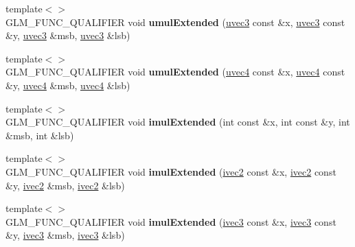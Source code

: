 \begin{DoxyCompactItemize}
\item 
\hypertarget{namespaceglm_a6e66bd04ac16ae0e3eb87e965b1609a9}{{\footnotesize template$<$$>$ }\\G\-L\-M\-\_\-\-F\-U\-N\-C\-\_\-\-Q\-U\-A\-L\-I\-F\-I\-E\-R void {\bfseries umul\-Extended} (\hyperlink{group__core__types_gac4ba593917841b859ba1683b8b52b8fa}{uvec3} const \&x, \hyperlink{group__core__types_gac4ba593917841b859ba1683b8b52b8fa}{uvec3} const \&y, \hyperlink{group__core__types_gac4ba593917841b859ba1683b8b52b8fa}{uvec3} \&msb, \hyperlink{group__core__types_gac4ba593917841b859ba1683b8b52b8fa}{uvec3} \&lsb)}\label{namespaceglm_a6e66bd04ac16ae0e3eb87e965b1609a9}

\item 
\hypertarget{namespaceglm_af466bd5c7fd7304b486b3f5985805349}{{\footnotesize template$<$$>$ }\\G\-L\-M\-\_\-\-F\-U\-N\-C\-\_\-\-Q\-U\-A\-L\-I\-F\-I\-E\-R void {\bfseries umul\-Extended} (\hyperlink{group__core__types_ga1c426d19627b32b14f0089f7f4ba7b1d}{uvec4} const \&x, \hyperlink{group__core__types_ga1c426d19627b32b14f0089f7f4ba7b1d}{uvec4} const \&y, \hyperlink{group__core__types_ga1c426d19627b32b14f0089f7f4ba7b1d}{uvec4} \&msb, \hyperlink{group__core__types_ga1c426d19627b32b14f0089f7f4ba7b1d}{uvec4} \&lsb)}\label{namespaceglm_af466bd5c7fd7304b486b3f5985805349}

\item 
\hypertarget{namespaceglm_a9472a4d6f9eec4abf4453a4be8365433}{{\footnotesize template$<$$>$ }\\G\-L\-M\-\_\-\-F\-U\-N\-C\-\_\-\-Q\-U\-A\-L\-I\-F\-I\-E\-R void {\bfseries imul\-Extended} (int const \&x, int const \&y, int \&msb, int \&lsb)}\label{namespaceglm_a9472a4d6f9eec4abf4453a4be8365433}

\item 
\hypertarget{namespaceglm_a9a2bbaf30c571f3851be2e0e60d856ca}{{\footnotesize template$<$$>$ }\\G\-L\-M\-\_\-\-F\-U\-N\-C\-\_\-\-Q\-U\-A\-L\-I\-F\-I\-E\-R void {\bfseries imul\-Extended} (\hyperlink{group__core__types_ga9e6ce9cfc7919976b318197e18d8a065}{ivec2} const \&x, \hyperlink{group__core__types_ga9e6ce9cfc7919976b318197e18d8a065}{ivec2} const \&y, \hyperlink{group__core__types_ga9e6ce9cfc7919976b318197e18d8a065}{ivec2} \&msb, \hyperlink{group__core__types_ga9e6ce9cfc7919976b318197e18d8a065}{ivec2} \&lsb)}\label{namespaceglm_a9a2bbaf30c571f3851be2e0e60d856ca}

\item 
\hypertarget{namespaceglm_ad7e696be671c1ff9cb6a7a3d2ef487f9}{{\footnotesize template$<$$>$ }\\G\-L\-M\-\_\-\-F\-U\-N\-C\-\_\-\-Q\-U\-A\-L\-I\-F\-I\-E\-R void {\bfseries imul\-Extended} (\hyperlink{group__core__types_ga6e12a4ca00d696f07da1df4eb73e0fe8}{ivec3} const \&x, \hyperlink{group__core__types_ga6e12a4ca00d696f07da1df4eb73e0fe8}{ivec3} const \&y, \hyperlink{group__core__types_ga6e12a4ca00d696f07da1df4eb73e0fe8}{ivec3} \&msb, \hyperlink{group__core__types_ga6e12a4ca00d696f07da1df4eb73e0fe8}{ivec3} \&lsb)}\label{namespaceglm_ad7e696be671c1ff9cb6a7a3d2ef487f9}


\end{DoxyCompactItemize}

